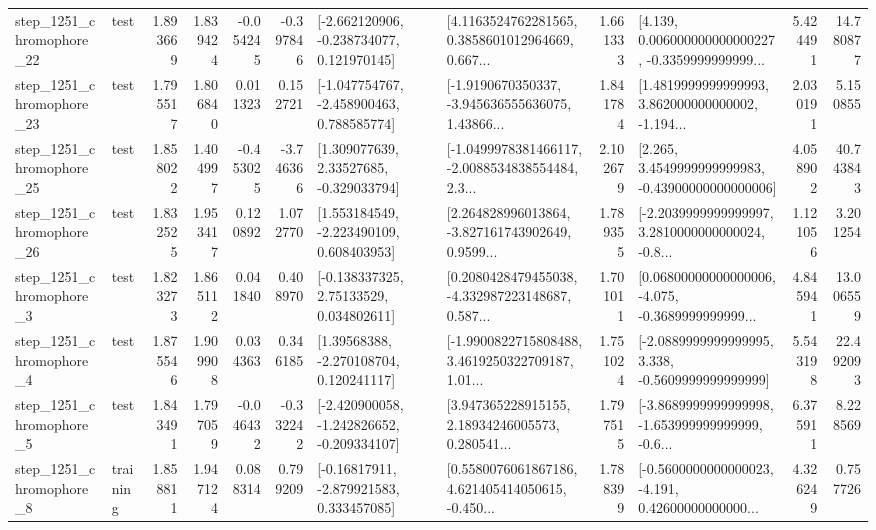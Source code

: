 \begin{tabular}{llrrrrllrlrr}
 step\_1251\_chromophore\_22 &      test &      1.893669 &    1.839424 &     -0.054245 & -0.397846 &   [-2.662120906, -0.238734077, 0.121970145] &  [4.1163524762281565, 0.3858601012964669, 0.667... &       1.661333 &  [4.139, 0.006000000000000227, -0.3359999999999... &            5.424491 &         14.780877 \\
 step\_1251\_chromophore\_23 &      test &      1.795517 &    1.806840 &      0.011323 &  0.152721 &   [-1.047754767, -2.458900463, 0.788585774] &  [-1.9190670350337, -3.945636555636075, 1.43866... &       1.841784 &  [1.4819999999999993, 3.862000000000002, -1.194... &            2.030191 &          5.150855 \\
 step\_1251\_chromophore\_25 &      test &      1.858022 &    1.404997 &     -0.453025 & -3.746366 &     [1.309077639, 2.33527685, -0.329033794] &  [-1.0499978381466117, -2.0088534838554484, 2.3... &       2.102679 &  [2.265, 3.4549999999999983, -0.43900000000000006] &            4.058902 &         40.743843 \\
 step\_1251\_chromophore\_26 &      test &      1.832525 &    1.953417 &      0.120892 &  1.072770 &    [1.553184549, -2.223490109, 0.608403953] &  [2.264828996013864, -3.827161743902649, 0.9599... &       1.789355 &  [-2.2039999999999997, 3.2810000000000024, -0.8... &            1.121056 &          3.201254 \\
  step\_1251\_chromophore\_3 &      test &      1.823273 &    1.865112 &      0.041840 &  0.408970 &     [-0.138337325, 2.75133529, 0.034802611] &  [0.2080428479455038, -4.332987223148687, 0.587... &       1.701011 &  [0.06800000000000006, -4.075, -0.3689999999999... &            4.845941 &         13.006559 \\
  step\_1251\_chromophore\_4 &      test &      1.875546 &    1.909908 &      0.034363 &  0.346185 &     [1.39568388, -2.270108704, 0.120241117] &  [-1.9900822715808488, 3.4619250322709187, 1.01... &       1.751024 &  [-2.0889999999999995, 3.338, -0.5609999999999999] &            5.543198 &         22.492093 \\
  step\_1251\_chromophore\_5 &      test &      1.843491 &    1.797059 &     -0.046432 & -0.332242 &  [-2.420900058, -1.242826652, -0.209334107] &  [3.947365228915155, 2.18934246005573, 0.280541... &       1.797515 &  [-3.8689999999999998, -1.653999999999999, -0.6... &            6.375911 &          8.228569 \\
  step\_1251\_chromophore\_8 &  training &      1.858811 &    1.947124 &      0.088314 &  0.799209 &    [-0.16817911, -2.879921583, 0.333457085] &  [0.5580076061867186, 4.621405414050615, -0.450... &       1.788399 &  [-0.5600000000000023, -4.191, 0.42600000000000... &            4.326249 &          0.757726 \\

\end{tabular}
